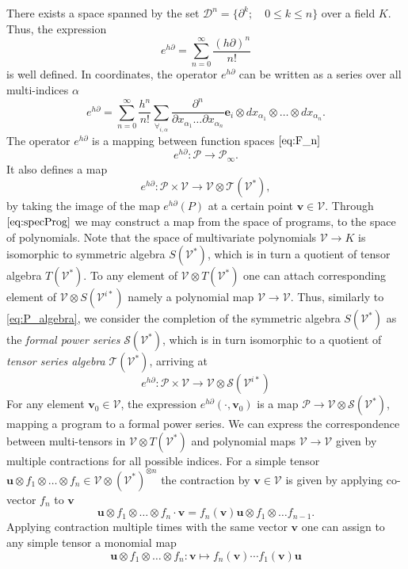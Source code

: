 \documentclass[smallcondensed]{svjour3}
\newcommand{\Ss}{\mathcal{S}}
\newcommand{\T}{\mathcal{T}}
\newcommand{\VV}{\mathcal{V}}
\newcommand{\e}{\mathbf{e}}
\newcommand{\uu}{\mathbf{u}}
\newcommand{\vv}{\mathbf{v}}
\newcommand{\dP}{\mathcal{P}}
\newcommand{\D}{\partial}
\newcommand{\DD}{\mathcal{D}}
\begin{document}
There exists a space spanned by the set $\DD^n=\{\D^k;\quad 0\le k\le n\}$ over a field $K$. Thus, the expression
 \begin{equation}
 	e^{h\D}=\sum\limits_{n=0}^{\infty}\frac{(h\D)^n}{n!}
 \end{equation}
 is well defined. In coordinates, the operator $e^{h\D}$ can be written as a
 series over all multi-indices $\alpha$
 \begin{equation}\label{eq:e^d}
 	e^{h\D}=\sum\limits_{n=0}^{\infty}\frac{h^n}{n!}\sum_{\forall_{i,\alpha}}\frac{\partial^n}{\partial
 		    x_{\alpha_1}\ldots \partial x_{\alpha_n}}\e_i\otimes
 		  dx_{\alpha_1}\otimes\ldots \otimes dx_{\alpha_n}.
 \end{equation}
The operator $e^{h\D}$ is a mapping between function spaces $\eqref{eq:F_n}$
 \begin{equation}
 	e^{h\D}:\dP\to\dP_\infty.
 \end{equation}
 It also defines a map
  \begin{equation}\label{eq:specProg}
  	e^{h\D}:\dP\times \VV\to \VV\otimes \T(\VV^*),
  \end{equation}
by taking the image of the map $e^{h\D}(P)$ at a certain point $\vv\in \VV$.  
Through $\eqref{eq:specProg}$ we may construct a map from the space of programs,
to the space of polynomials. Note that the space of multivariate polynomials
$\VV\to K$ is isomorphic to symmetric algebra $S(\VV^*)$, which is in turn a
quotient of tensor algebra $T(\VV^*)$.
To any element of
 $\VV\otimes T(\VV^*)$ one can attach corresponding element of $\VV\otimes S(\VV^{i*})$
 namely a polynomial map  $\VV\to \VV$. Thus, similarly to \eqref{eq:P_algebra}, we consider the completion of the symmetric algebra $S(\VV^*)$ as the \emph{formal power series} $\Ss(\VV^{*})$, which is in turn isomorphic to a quotient of \emph{tensor series algebra} $\T(\VV^*)$, arriving at 
 \begin{equation}\label{eq:pToPol}
 	e^{h\D}: \dP\times \VV\to \VV\otimes \Ss(\VV^{i*})
 \end{equation}
 For any element $\vv_0\in \VV$, the expression $e^{h\D}(\cdot,\vv_0)$ is a map $\dP\to
 \VV\otimes \Ss(\VV^*)$, mapping a program to a formal power series. We can express the
 correspondence between multi-tensors in $\VV\otimes T(\VV^*)$ and polynomial maps
 $\VV\to \VV$ given by multiple contractions for all possible indices. For a simple tensor $\uu\otimes
 f_1\otimes\ldots\otimes f_n\in \VV\otimes(\VV^*)^{\otimes n}$ the contraction by
 $\vv\in \VV$ is given by applying co-vector $f_n$ to $\vv$ 
 \begin{equation}
   \label{eq:contraction}
 \uu\otimes f_1\otimes\ldots\otimes f_n\cdot \vv = f_n(\vv) \uu\otimes f_1\otimes\ldots f_{n-1}.
 \end{equation}
Applying contraction multiple times with the same vector $\vv$ one can assign to
any simple tensor a monomial map 
 \begin{equation}
   \label{eq:tensor->poly}
 \uu\otimes f_1\otimes\ldots\otimes f_n: \vv \mapsto f_n(\vv)\cdots f_1(\vv) \uu
 \end{equation}
\end{document}
